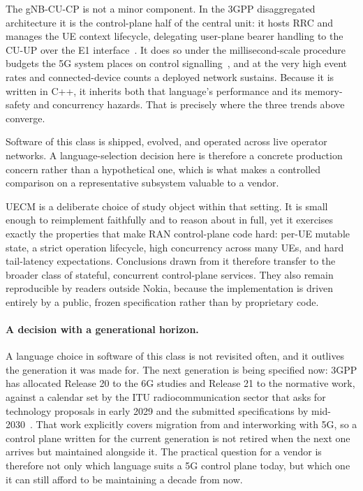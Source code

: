 \documentclass[english,oneside,a4paper,censored,csm,software-track-2020]{HYthesisML}
\begin{document}
The gNB-CU-CP is not a minor component. In the 3GPP disaggregated architecture it is the
control-plane half of the central unit: it hosts RRC and manages the UE context lifecycle,
delegating user-plane bearer handling to the CU-UP over the E1
interface~\cite{3gpp38401,3gpp38300,3gpp38331,3gpp38463}. It does so under the
millisecond-scale procedure budgets the 5G system places on control
signalling~\cite{3gpp38913}, and at the very high event rates and connected-device counts a
deployed network sustains. Because it is written in C++, it inherits both that language's
performance and its memory-safety and concurrency hazards. That is precisely where the three
trends above converge.

Software of this class is shipped, evolved, and operated across live operator networks. A
language-selection decision here is therefore a concrete production concern rather than a
hypothetical one, which is what makes a controlled comparison on a representative subsystem
valuable to a vendor.

UECM is a deliberate choice of study object within that setting. It is small enough to
reimplement faithfully and to reason about in full, yet it exercises exactly the properties
that make RAN control-plane code hard: per-UE mutable state, a strict operation lifecycle,
high concurrency across many UEs, and hard tail-latency expectations. Conclusions drawn from
it therefore transfer to the broader class of stateful, concurrent control-plane services.
They also remain reproducible by readers outside Nokia, because the implementation is driven
entirely by a public, frozen specification rather than by proprietary code.

\paragraph{A decision with a generational horizon.}
A language choice in software of this class is not revisited often, and it outlives the
generation it was made for. The next generation is being specified now: 3GPP has allocated
Release 20 to the 6G studies and Release 21 to the normative work, against a calendar set by the
ITU radiocommunication sector that asks for technology proposals in early 2029 and the submitted
specifications by mid-2030~\cite{itu2023imt2030,3gpp2024road6g}. That work explicitly covers
migration from and interworking with 5G, so a control plane written for the current generation is
not retired when the next one arrives but maintained alongside it. The practical question for a
vendor is therefore not only which language suits a 5G control plane today, but which one it can
still afford to be maintaining a decade from now.
\end{document}
